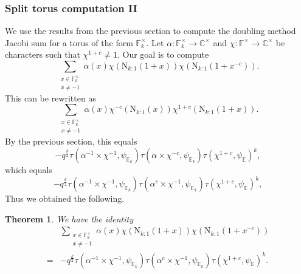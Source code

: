 \documentclass[12pt, reqno]{amsart}
\newtheorem{theorem}{Theorem}[section]
\theoremstyle{definition}
\theoremstyle{definition}
\theoremstyle{definition}
\newcommand{\cComplex}{\mathbb{C}}
\newcommand{\multiplicativegroup}[1]{#1^{\times}}
\newcommand{\fieldCharacter}{\psi}
\newcommand{\involution}[1]{#1^{c}}
\newcommand{\minusInvolution}[1]{#1^{-c}}
\newcommand{\involutionPlusOne}[1]{#1^{1+c}}
\newcommand{\FieldNorm}[2]{\mathrm{N}_{#1:#2}}
\newcommand{\finiteField}{\mathbb{F}}
\newcommand{\quadraticExtension}{\mathbb{E}}
\newcommand{\finiteFieldExtension}[1]{\finiteField_{#1}}
\newcommand{\quadraticFieldExtension}[1]{\quadraticExtension_{#1}}
\newcommand{\GaussSumCharacter}[3]{\tau\left(#1 \times #2, #3\right)}
\begin{document}
\subsubsection{Split torus computation II}
We use the results from the previous section to compute the doubling method Jacobi sum for a torus of the form $\multiplicativegroup{\finiteFieldExtension{k}}$. Let $\alpha \colon \multiplicativegroup{\finiteFieldExtension{k}} \to \multiplicativegroup{\cComplex}$ and $\chi \colon \multiplicativegroup{\finiteField} \to \multiplicativegroup{\cComplex}$ be characters such that $\involutionPlusOne{\chi} \ne 1$. Our goal is to compute $$\sum_{\substack{x \in \multiplicativegroup{\finiteFieldExtension{k}}\\
		x \ne -1}} \alpha \left(x\right) \chi\left(\FieldNorm{k}{1}\left(1 + x\right)\right) \chi\left(\FieldNorm{k}{1}\left(1 + \minusInvolution{x}\right)\right).$$
This can be rewritten as
$$\sum_{\substack{x \in \multiplicativegroup{\finiteFieldExtension{k}}\\
		x \ne -1}} \alpha \left(x\right) \minusInvolution{\chi}\left(\FieldNorm{k}{1}\left(x\right)\right) \involutionPlusOne{\chi}\left(\FieldNorm{k}{1}\left(1 + x\right)\right).$$
By the previous section, this equals
\begin{equation*}
	-q^{\frac{k}{2}} \GaussSumCharacter{\alpha^{-1}}{\chi^{-1}}{\fieldCharacter_{\quadraticFieldExtension{k}}} \GaussSumCharacter{\alpha}{\minusInvolution{\chi}}{\fieldCharacter_{\quadraticFieldExtension{k}}} \tau\left(\involutionPlusOne{\chi}, \fieldCharacter_{\quadraticExtension}\right)^k,
\end{equation*}
which equals
\begin{equation*}
	-q^{\frac{k}{2}} \GaussSumCharacter{\alpha^{-1}}{\chi^{-1}}{\fieldCharacter_{\quadraticFieldExtension{k}}} \GaussSumCharacter{\involution{\alpha}}{\chi^{-1}}{\fieldCharacter_{\quadraticFieldExtension{k}}} \tau\left(\involutionPlusOne{\chi}, \fieldCharacter_{\quadraticExtension}\right)^k,
\end{equation*}
Thus we obtained the following.
\begin{theorem}We have the identity
\begin{align*}
	& \sum_{\substack{x \in \multiplicativegroup{\finiteFieldExtension{k}}\\
			x \ne -1}} \alpha \left(x\right) \chi\left(\FieldNorm{k}{1}\left(1 + x\right)\right) \chi\left(\FieldNorm{k}{1}\left(1 + \minusInvolution{x}\right)\right) \\
	=& -q^{\frac{k}{2}} \GaussSumCharacter{\alpha^{-1}}{\chi^{-1}}{\fieldCharacter_{\quadraticFieldExtension{k}}} \GaussSumCharacter{\involution{\alpha}}{\chi^{-1}}{\fieldCharacter_{\quadraticFieldExtension{k}}} \tau\left(\involutionPlusOne{\chi}, \fieldCharacter_{\quadraticExtension}\right)^k.
\end{align*}
\end{theorem}
\end{document}
